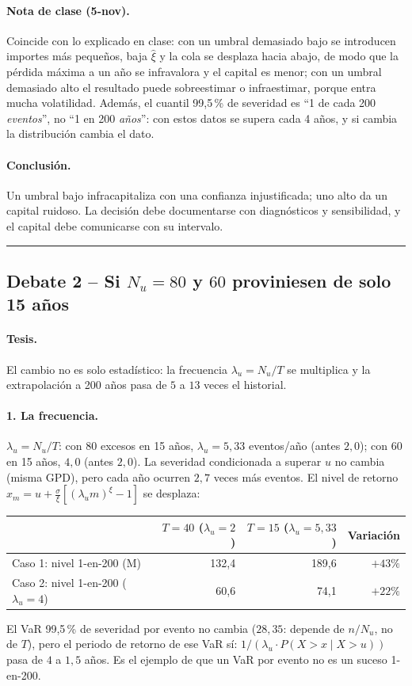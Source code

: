 \documentclass[a4paper,12pt]{article}
\newcommand{\euro}{\texteuro}
\begin{document}
\paragraph{Nota de clase (5-nov).} Coincide con lo explicado en clase: con un umbral demasiado bajo se introducen importes m\'as peque\~nos, baja $\hat\xi$ y la cola se desplaza hacia abajo, de modo que la p\'erdida m\'axima a un a\~no se infravalora y el capital es menor; con un umbral demasiado alto el resultado puede sobreestimar o infraestimar, porque entra mucha volatilidad. Adem\'as, el cuantil 99,5\,\% de severidad es ``1 de cada 200 \emph{eventos}'', no ``1 en 200 \emph{a\~nos}'': con estos datos se supera cada 4 a\~nos, y si cambia la distribuci\'on cambia el dato.

\paragraph{Conclusi\'on.} Un umbral bajo infracapitaliza con una confianza injustificada; uno alto da un capital ruidoso. La decisi\'on debe documentarse con diagn\'osticos y sensibilidad, y el capital debe comunicarse con su intervalo.

\bigskip\hrule\bigskip

\subsection{Debate 2 -- Si $N_u=80$ y $60$ proviniesen de solo 15 a\~nos}

\paragraph{Tesis.} El cambio no es solo estad\'istico: la frecuencia $\lambda_u=N_u/T$ se multiplica y la extrapolaci\'on a 200 a\~nos pasa de $5$ a $13$ veces el historial.

\paragraph{1. La frecuencia.} $\lambda_u=N_u/T$: con 80 excesos en 15 a\~nos, $\lambda_u=5{,}33$ eventos/a\~no (antes $2{,}0$); con 60 en 15 a\~nos, $4{,}0$ (antes $2{,}0$). La severidad condicionada a superar $u$ no cambia (misma GPD), pero cada a\~no ocurren $2{,}7$ veces m\'as eventos. El nivel de retorno $x_m=u+\frac\sigma\xi[(\lambda_um)^\xi-1]$ se desplaza:
\begin{center}
\small
\begin{tabular}{lrrr}
\toprule
 & $T=40$ ($\lambda_u=2$) & $T=15$ ($\lambda_u=5{,}33$) & Variaci\'on\\
\midrule
Caso 1: nivel 1-en-200 (M\euro) & 132,4 & 189,6 & $+43\%$\\
Caso 2: nivel 1-en-200 ($\lambda_u=4$) & 60,6 & 74,1 & $+22\%$\\
\bottomrule
\end{tabular}
\end{center}
El VaR 99,5\,\% de severidad por evento no cambia ($28{,}35$: depende de $n/N_u$, no de $T$), pero el periodo de retorno de ese VaR s\'i: $1/(\lambda_u\cdot P(X>x\mid X>u))$ pasa de $4$ a $1{,}5$ a\~nos. Es el ejemplo de que un VaR por evento no es un suceso 1-en-200.
\end{document}
